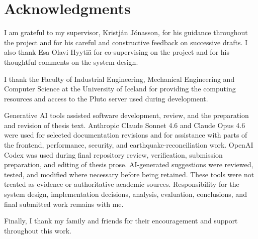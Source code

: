 \documentclass[12pt]{article}
\newif\ifchapterheaders
\begin{document}
\clearpage
\null
\thispagestyle{empty}
\newpage

\section*{Acknowledgments}

I am grateful to my supervisor, Kristján Jónasson, for his guidance throughout the project and for his careful and constructive feedback on successive drafts. I also thank Esa Olavi Hyytiä for co-supervising on the project and for his thoughtful comments on the system design.

I thank the Faculty of Industrial Engineering, Mechanical Engineering and Computer Science at the University of Iceland for providing the computing resources and access to the Pluto server used during development.

Generative AI tools assisted software development, review, and the preparation and revision of thesis text. Anthropic Claude Sonnet 4.6 and Claude Opus 4.6 were used for selected documentation revisions and for assistance with parts of the frontend, performance, security, and earthquake-reconciliation work. OpenAI Codex was used during final repository review, verification, submission preparation, and editing of thesis prose. AI-generated suggestions were reviewed, tested, and modified where necessary before being retained. These tools were not treated as evidence or authoritative academic sources. Responsibility for the system design, implementation decisions, analysis, evaluation, conclusions, and final submitted work remains with me.

Finally, I thank my family and friends for their encouragement and support throughout this work.

\clearpage
\null
\thispagestyle{empty}
\newpage

\chapterheaderstrue
\end{document}
